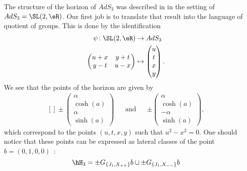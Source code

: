 	The structure of the horizon of $AdS_3$ was described in \cite{Keio} in the setting of $AdS_3=\SL(2,\eR)$. Our first job is to translate that result into the language of quotient of groups. This is done by the identification
	\begin{equation}
		\begin{aligned}
			\psi\colon \SL(2,\eR) & \to AdS_3            \\
			\begin{pmatrix}
				u+x & y+t \\
				y-t & u-x
			\end{pmatrix}       & \mapsto \begin{pmatrix}
				                              u \\
				                              t \\
				                              x \\
				                              y
			                              \end{pmatrix}.
		\end{aligned}
	\end{equation}
	We see that the points of the horizon are given by
	\begin{equation}			\label{EqHOrAdSTroisVecteur}
		\begin{aligned}[]
			\pm\begin{pmatrix}
				   \alpha   \\
				   \cosh(a) \\
				   \alpha   \\
				   \sinh(a)
			   \end{pmatrix} &  & \text{and} &  & \pm\begin{pmatrix}
				                                         \alpha   \\
				                                         \cosh(a) \\
				                                         -\alpha  \\
				                                         \sinh(a)
			                                         \end{pmatrix},
		\end{aligned}
	\end{equation}
	which correspond to the points $(u,t,x,y)$ such that $u^2-x^2=0$. One should notice that these points can be expressed as lateral classes of the point $b=(0,1,0,0)$~:
	\begin{equation}
		\hH_3=\pm G_{\{ J_1,X_{++} \}}b\cup\pm G_{\{ J_1,X_{--} \}}b
	\end{equation}
